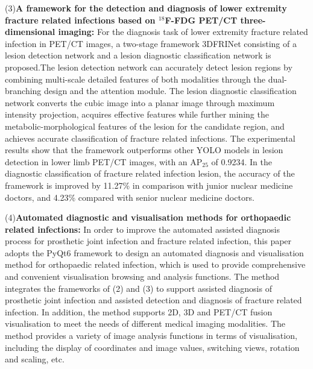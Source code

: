 \begin{eabstract}
    (3)\textbf{A framework for the detection and diagnosis of lower extremity fracture related infections based on \(^{18}\)F-FDG PET/CT three-dimensional imaging: }For the diagnosis task of lower extremity fracture related infection in PET/CT images, a two-stage framework 3DFRINet consisting of a lesion detection network and a lesion diagnostic classification network is proposed.The lesion detection network can accurately detect lesion regions by combining multi-scale detailed features of both modalities through the dual-branching design and the attention module. The lesion diagnostic classification network converts the cubic image into a planar image through maximum intensity projection, acquires effective features while further mining the metabolic-morphological features of the lesion for the candidate region, and achieves accurate classification of fracture related infections. The experimental results show that the framework outperforms other YOLO models in lesion detection in lower limb PET/CT images, with an AP\(_{25}\) of 0.9234. In the diagnostic classification of fracture related infection lesion, the accuracy of the framework is improved by 11.27\% in comparison with junior nuclear medicine doctors, and 4.23\% compared with senior nuclear medicine doctors.

    (4)\textbf{Automated diagnostic and visualisation methods for orthopaedic related infections: }In order to improve the automated assisted diagnosis process for prosthetic joint infection and fracture related infection, this paper adopts the PyQt6 framework to design an automated diagnosis and visualisation method for orthopaedic related infection, which is used to provide comprehensive and convenient visualisation browsing and analysis functions. The method integrates the frameworks of (2) and (3) to support assisted diagnosis of prosthetic joint infection and assisted detection and diagnosis of fracture related infection. In addition, the method supports 2D, 3D and PET/CT fusion visualisation to meet the needs of different medical imaging modalities. The method provides a variety of image analysis functions in terms of visualisation, including the display of coordinates and image values, switching views, rotation and scaling, etc.

\end{eabstract}

